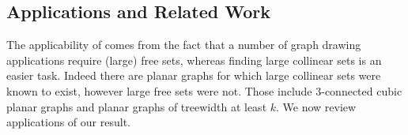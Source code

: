 \subsection{Applications and Related Work}

The applicability of  comes from the fact that a number of graph drawing applications require (large) free sets, whereas finding large collinear sets
is an easier task. Indeed there are planar graphs for which large collinear sets were known to exist, however large free sets were not. Those include 3-connected cubic planar graphs
and planar graphs of treewidth at least $k$.
%
We now review applications of our result. 



